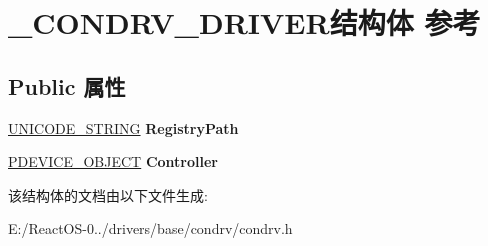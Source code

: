 \hypertarget{struct___c_o_n_d_r_v___d_r_i_v_e_r}{}\section{\+\_\+\+C\+O\+N\+D\+R\+V\+\_\+\+D\+R\+I\+V\+E\+R结构体 参考}
\label{struct___c_o_n_d_r_v___d_r_i_v_e_r}
\subsection*{Public 属性}
\begin{DoxyCompactItemize}
\item 
\mbox{\label{struct___c_o_n_d_r_v___d_r_i_v_e_r_a37f3f00da556791b861dae155b7a6861}} 
\hyperlink{struct___u_n_i_c_o_d_e___s_t_r_i_n_g}{U\+N\+I\+C\+O\+D\+E\+\_\+\+S\+T\+R\+I\+NG} {\bfseries Registry\+Path}
\item 
\mbox{\label{struct___c_o_n_d_r_v___d_r_i_v_e_r_ad788673dffab85219f7822fc6cb8ac43}} 
\hyperlink{struct___d_e_v_i_c_e___o_b_j_e_c_t}{P\+D\+E\+V\+I\+C\+E\+\_\+\+O\+B\+J\+E\+CT} {\bfseries Controller}
\end{DoxyCompactItemize}


该结构体的文档由以下文件生成\+:\begin{DoxyCompactItemize}
\item 
E\+:/\+React\+O\+S-\/0../drivers/base/condrv/condrv.\+h\end{DoxyCompactItemize}
